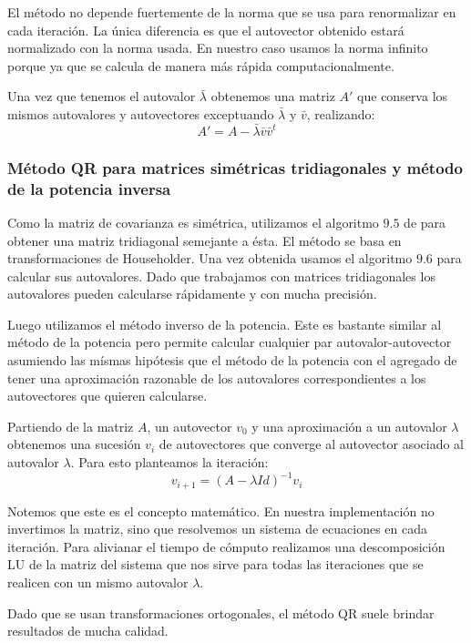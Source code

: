 		El m\'etodo no depende fuertemente de la norma que se usa para renormalizar
		en cada iteraci\'on. La \'unica diferencia es que el autovector obtenido
		estar\'a normalizado con la norma usada. En nuestro caso usamos la norma
		infinito porque ya que se calcula de manera m\'as r\'apida computacionalmente.

		Una vez que tenemos el autovalor $\bar{\lambda}$ obtenemos una matriz
		$A'$ que conserva los mismos autovalores y autovectores exceptuando
		$\bar{\lambda}$ y $\bar{v}$, realizando:
		$$A' = A-\bar{\lambda}\bar{v}\bar{v}^t$$

	\subsubsection{M\'etodo QR para matrices sim\'etricas tridiagonales y m\'etodo
	de la potencia inversa}

		Como la matriz de covarianza es sim\'etrica, utilizamos el algoritmo
		$9.5$ de \cite{burden} para obtener una matriz tridiagonal semejante a \'esta.
		El m\'etodo se basa en transformaciones de Householder.
		Una vez obtenida usamos el algoritmo $9.6$ para calcular sus autovalores.
		Dado que trabajamos con matrices tridiagonales los autovalores pueden
		calcularse r\'apidamente y con mucha precisi\'on.

		Luego utilizamos el m\'etodo inverso de la potencia.
		Este es bastante similar al m\'etodo de la potencia pero permite calcular
		cualquier par autovalor-autovector asumiendo las m\'ismas hip\'otesis
		que el m\'etodo de la potencia con el agregado de tener una aproximaci\'on
		razonable de los autovalores correspondientes a los autovectores que
		quieren calcularse.

		Partiendo de la matriz $A$, un autovector $v_0$ y una aproximaci\'on a un
		autovalor $\lambda$ obtenemos una sucesi\'on ${v_i}$ de autovectores
		que converge al autovector asociado al autovalor $\lambda$.
		Para esto planteamos la iteraci\'on:
		$$v_{i+1} = (A-\lambda Id)^{-1}v_i$$

		Notemos que este es el concepto matem\'atico. En nuestra implementaci\'on
		no invertimos la matriz, sino que resolvemos un sistema de ecuaciones
		en cada iteraci\'on. Para alivianar el tiempo de c\'omputo realizamos
		una descomposici\'on LU de la matriz del sistema que nos sirve para
		todas las iteraciones que se realicen con un mismo autovalor $\lambda$.
	
		Dado que se usan transformaciones ortogonales, el m\'etodo QR suele
		brindar resultados de mucha calidad.

